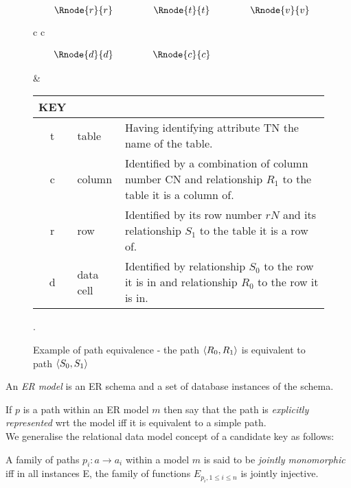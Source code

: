 \documentclass[10pt,a4paper]{article}
\newcommand{\genericmodel}{\mathcal{M}}
\renewcommand{\genericmodel}{{m}}
\newcommand{\term}[1]{\textit{{#1}}}
\begin{document}
\begin{figure} [H]
\begin{center}
\begin{tabular}{c c}
$
\begin{array}{cp{0.75cm}cp{0.75cm}c}
   \Rnode{r}{r}     & & \Rnode{t}{t} & & \Rnode{v}{v} \\[1.2cm]     
	 \Rnode{d}{d}   & & \Rnode{c}{c} & &               
\end{array}
$
\idcomp
{} 
\idcomp
{} 
\idcomp
{}
\idcomp
{}
\idcomp
{}
\idcomp
{}
\idcomp

& \footnotesize
\begin{tabular}{c p{1.5cm} p{4cm}}
KEY && \\
\hline
t & table & Having identifying attribute TN the name of the table. \\
c & column & Identified by a combination of column number CN and relationship $R_1$ to the table it is a column of.\\
r & row & Identified by its row number $rN$ and its relationship $S_1$ to the table it is a row of.\\
d & data cell & Identified by relationship $S_0$ to the row it is in and relationship $R_0$ to the row it is in. \\
\end{tabular} 
\end{tabular}
\end{center}
\caption{Example of path equivalence - the path $\langle R_0,R_1\rangle$ is equivalent to path $\langle S_0,S_1\rangle$}.
\label{datatablegraph}
\end{figure}

\begin{definition}
\noindent An \term{ER model} is an ER schema and a set of database instances of the schema. \\
\end{definition}

\noindent If $p$ is a path within an ER model $\genericmodel$ then say that the path is \term{explicitly represented} wrt the model iff it is equivalent to a simple path. \\

\noindent We generalise the relational data model concept of a candidate key as follows:

\begin{definition}
A family of paths $p_i: a \rightarrow a_i$ within a model $\genericmodel$ is said to be \term{jointly monomorphic} iff in all instances E,
the family of functions 
$E_{p_i, 1 \leq i \leq n}$  is jointly injective. 
\end{definition}
\end{document}
